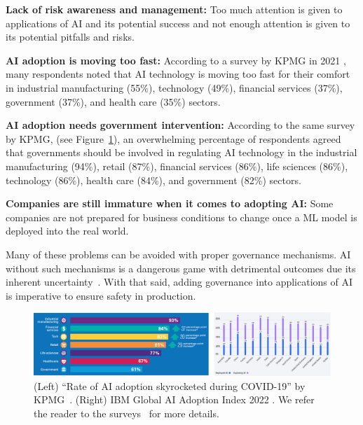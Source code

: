 \documentclass{article}
\begin{document}
\textbf{Lack of risk awareness and management:} Too much attention is given to applications of AI and its potential success and not enough attention is given to its potential pitfalls and risks.

\textbf{AI adoption is moving too fast:} According to a survey by KPMG in 2021 \cite{KPMG}, many respondents noted that AI technology is moving too fast for their comfort in industrial manufacturing (55\%), technology (49\%), financial services (37\%), government (37\%), and health care (35\%) sectors.

\textbf{AI adoption needs government intervention:} According to the same survey by KPMG, \cite{KPMG} (see Figure~\ref{fig:surveys}), an overwhelming percentage of respondents agreed that governments should be involved in regulating AI technology in the industrial manufacturing (94\%), retail (87\%), financial services (86\%), life sciences (86\%), technology (86\%), health care (84\%), and government (82\%) sectors.

\textbf{Companies are still immature when it comes to adopting AI:} Some companies are not prepared for business conditions to change once a ML model is deployed into the real world.

Many of these problems can be avoided with proper governance mechanisms. AI without such mechanisms is a dangerous game with detrimental outcomes due its inherent uncertainty~\cite{zadeh1986probability, bresina2012planning}. %
With that said, adding governance into applications of AI is imperative to ensure safety in production. %

\begin{figure}[t]
    \centering
    \includegraphics[width=\linewidth]{figures/surveys.png}
    \caption{(Left) ``Rate of AI adoption skyrocketed during COVID-19'' by KPMG~\cite{KPMG}. (Right) IBM Global AI Adoption Index 2022 \cite{IBM}. We refer the reader to the surveys~\cite{KPMG, IBM} for more details.}
    \label{fig:surveys}
\end{figure}
\end{document}
